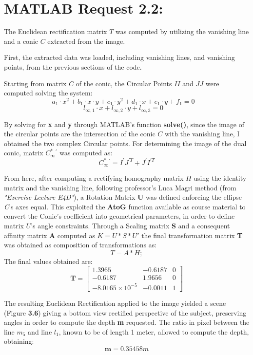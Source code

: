 \documentclass{Configuration_Files/PoliMi3i_thesis}
\begin{document}
\newpage
\section{MATLAB Request 2.2: }

The Euclidean rectification matrix \( T \) was computed by utilizing the vanishing line and a conic \( C \) extracted from the image. 

First, the extracted data was loaded, including vanishing lines, and vanishing points, from the previous sections of the code. 

Starting from matrix \( C \) of the conic, the Circular Points \( II \) and \( JJ \) were computed solving the system:
\[
a_{1} \cdot x^{2} + b_{1} \cdot x \cdot y + c_{1} \cdot y^{2} + d_{1} \cdot x + e_{1} \cdot y + f_{1} = 0 \quad 
\]
\[
l_{\infty,1} \cdot x + l_{\infty,2} \cdot y + l_{\infty,3} = 0 \quad 
\]

By solving for \textbf{x} and \textbf{y} through MATLAB's function \textbf{solve()}, since the image of the circular points are the intersection of the conic \( C \) with the vanishing line, I obtained the two complex Circular points.
For determining the image of the dual conic, matrix \(C^{*}_{\infty}{}^{\prime}\) was computed as:
\[
C^{*}_{\infty}{}^{\prime} = I^{\prime}J^{\prime T} + J^{\prime}I^{\prime T}
\]

From here, after computing a rectifying homography matrix \( H \) using the identity matrix and the vanishing line, following professor's Luca Magri method (from \textit{"Exercise Lecture E4D"}), a Rotation Matrix \textbf{U} was defined enforcing the ellipse \textit{C}'s axes equal. This exploited the \textbf{AtoG} function available as course material to convert the Conic's coefficient into geometrical parameters, in order to define matrix $U$'s angle constraints. Through a Scaling matrix \textbf{S} and a consequent affinity matrix \textbf{A} computed as \(K = U * S * U'\) the final transformation matrix \textbf{T} was obtained as composition of transformations as:
\[
T = A * H;
\]
The final values obtained are:
\[
\mathbf{T} = \begin{bmatrix}
1.3965 & -0.6187 & 0 \\
-0.6187 & 1.9656 & 0 \\
-8.0165\times10^{-5} & -0.0011 & 1
\end{bmatrix}
\]

The resulting Euclidean Rectification applied to the image yielded a scene (Figure \textbf{3.6}) giving a bottom view rectified perspective of the subject, preserving angles in order to compute the depth \textbf{m} requested. The ratio in pixel between the line \( m_5 \) and line \( l_1 \), known to be of length 1 meter, allowed to compute the depth, obtaining: 
\[
\mathbf{m} = 0.35458 m
\]
\end{document}
